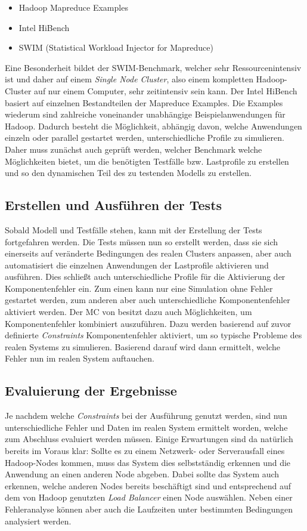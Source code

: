 \begin{itemize}[noitemsep]
	\item Hadoop Mapreduce Examples
	\item Intel HiBench
	\item SWIM (Statistical Workload Injector for Mapreduce)
\end{itemize}

Eine Besonderheit bildet der SWIM-Benchmark, welcher sehr Ressourcenintensiv ist und daher auf einem \emph{Single Node Cluster}, also einem kompletten Hadoop-Cluster auf nur einem Computer, sehr zeitintensiv sein kann. Der Intel HiBench basiert auf einzelnen Bestandteilen der Mapreduce Examples. Die Examples wiederum sind zahlreiche voneinander unabhängige Beispielanwendungen für Hadoop. Dadurch besteht die Möglichkeit, abhängig davon, welche Anwendungen einzeln oder parallel gestartet werden,  unterschiedliche Profile zu simulieren. Daher muss zunächst auch geprüft werden, welcher Benchmark welche Möglichkeiten bietet, um die benötigten Testfälle bzw. Lastprofile zu erstellen und so den dynamischen Teil des zu testenden Modells zu erstellen.

\subsection{Erstellen und Ausführen der Tests}\label{sec:testausführung}

Sobald Modell und Testfälle stehen, kann mit der Erstellung der Tests fortgefahren werden. Die Tests müssen nun so erstellt werden, dass sie sich einerseits auf veränderte Bedingungen des realen Clusters anpassen, aber auch automatisiert die einzelnen Anwendungen der Lastprofile aktivieren und ausführen. Dies schließt auch unterschiedliche Profile für die Aktivierung der Komponentenfehler ein. Zum einen kann nur eine Simulation ohne Fehler gestartet werden, zum anderen aber auch unterschiedliche Komponentenfehler aktiviert werden. Der MC von \sS besitzt dazu auch Möglichkeiten, um Komponentenfehler kombiniert auszuführen. Dazu werden basierend auf zuvor definierte \emph{Constraints} Komponentenfehler aktiviert, um so typische Probleme des realen Systems zu simulieren. Basierend darauf wird dann ermittelt, welche Fehler nun im realen System auftauchen.

\subsection{Evaluierung der Ergebnisse}\label{sec:evaluierung}

Je nachdem welche \emph{Constraints} bei der Ausführung genutzt werden, sind nun unterschiedliche Fehler und Daten im realen System ermittelt worden, welche zum Abschluss evaluiert werden müssen. Einige Erwartungen sind da natürlich bereits im Voraus klar: Sollte es zu einem Netzwerk- oder Serverausfall eines Hadoop-Nodes kommen, muss das System dies selbstständig erkennen und die Anwendung an einen anderen Node abgeben. Dabei sollte das System auch erkennen, welche anderen Nodes bereits beschäftigt sind und entsprechend auf dem von Hadoop genutzten \emph{Load Balancer} einen Node auswählen. Neben einer Fehleranalyse können aber auch die Laufzeiten unter bestimmten Bedingungen analysiert werden.
